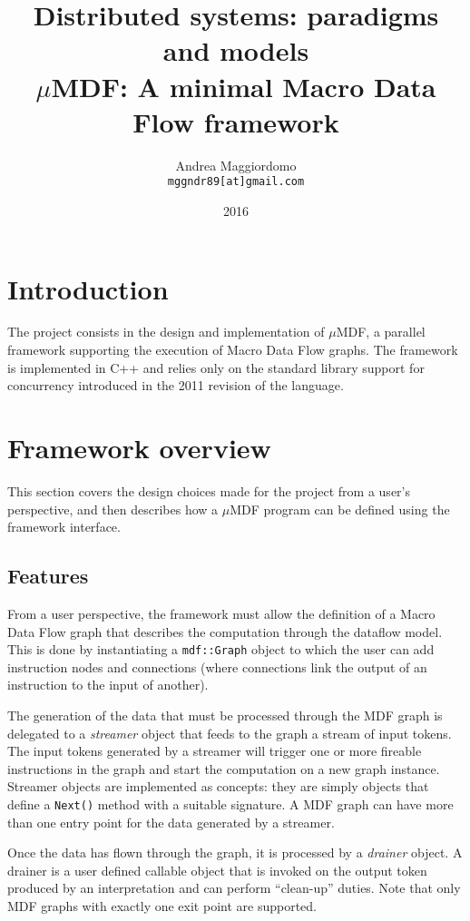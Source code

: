 \documentclass[a4paper, 11pt, oneside]{article}
\title{{\Large Distributed systems: paradigms and models} \\[3mm] {\LARGE $\mu$MDF: A minimal Macro Data Flow framework} \\[3mm]}
\author{Andrea Maggiordomo \\ \texttt{mggndr89[at]gmail.com}}
\date{2016}
\begin{document}
\maketitle

\section{Introduction}

The project consists in the design and implementation of $\mu$MDF, a parallel framework supporting the execution of Macro Data Flow graphs. The framework is implemented in C++ and relies only on the standard library support for concurrency introduced in the 2011 revision of the language.

\section{Framework overview}

This section covers the design choices made for the project from a user's perspective, and then describes how a $\mu$MDF program can be defined using the framework interface.

\subsection{Features}

From a user perspective, the framework must allow the definition of a Macro Data Flow graph that describes the computation through the dataflow model. This is done by instantiating a \texttt{mdf::Graph} object to which the user can add instruction nodes and connections (where connections link the output of an instruction to the input of another).

The generation of the data that must be processed through the MDF graph is delegated to a \emph{streamer} object that feeds to the graph a stream of input tokens. The input tokens generated by a streamer will trigger one or more fireable instructions in the graph and start the computation on a new graph instance. Streamer objects are implemented as concepts: they are simply objects that define a \texttt{Next()} method with a suitable signature. A MDF graph can have more than one entry point for the data generated by a streamer.

Once the data has flown through the graph, it is processed by a \emph{drainer} object. A drainer is a user defined callable object that is invoked on the output token produced by an interpretation and can perform ``clean-up'' duties. Note that only MDF graphs with exactly one exit point are supported.
\end{document}
